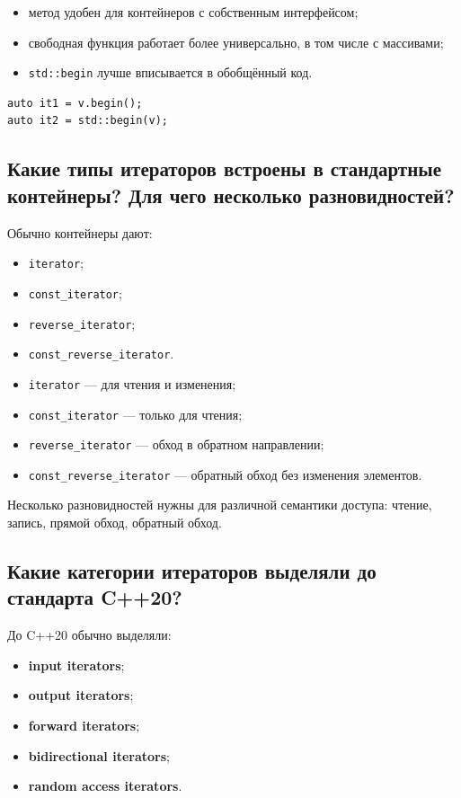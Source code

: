 \begin{itemize}
    \item метод удобен для контейнеров с собственным интерфейсом;
    \item свободная функция работает более универсально, в том числе с массивами;
    \item \texttt{std::begin} лучше вписывается в обобщённый код.
\end{itemize}

\begin{example}
\begin{verbatim}
auto it1 = v.begin();
auto it2 = std::begin(v);
\end{verbatim}
\end{example}

\subsection{Какие типы итераторов встроены в стандартные контейнеры? Для чего несколько разновидностей?}
Обычно контейнеры дают:
\begin{itemize}
    \item \texttt{iterator};
    \item \texttt{const\_iterator};
    \item \texttt{reverse\_iterator};
    \item \texttt{const\_reverse\_iterator}.
\end{itemize}

\begin{itemize}
    \item \texttt{iterator} — для чтения и изменения;
    \item \texttt{const\_iterator} — только для чтения;
    \item \texttt{reverse\_iterator} — обход в обратном направлении;
    \item \texttt{const\_reverse\_iterator} — обратный обход без изменения элементов.
\end{itemize}

\begin{remark}
Несколько разновидностей нужны для различной семантики доступа: чтение, запись, прямой обход, обратный обход.
\end{remark}

\subsection{Какие категории итераторов выделяли до стандарта C++20?}
До C++20 обычно выделяли:
\begin{itemize}
    \item \textbf{input iterators};
    \item \textbf{output iterators};
    \item \textbf{forward iterators};
    \item \textbf{bidirectional iterators};
    \item \textbf{random access iterators}.
\end{itemize}

